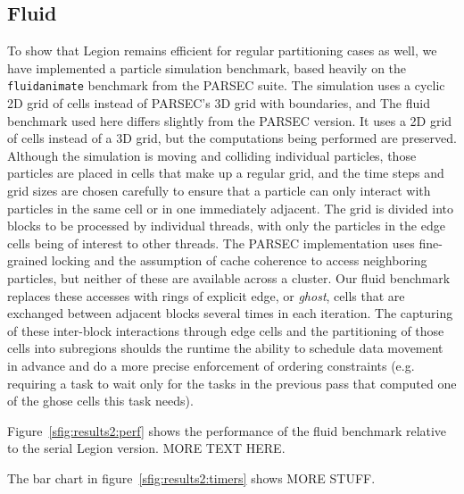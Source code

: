 

\subsection{Fluid}

To show that Legion remains efficient for regular partitioning cases as well,
we have implemented a particle simulation benchmark, based heavily on the
{\tt fluidanimate} benchmark from the PARSEC suite.  The simulation uses a
cyclic 2D grid of cells instead of PARSEC's 3D grid with boundaries, and 
The fluid benchmark used here differs slightly from the PARSEC version.  It
uses a 2D grid of cells instead of a 3D grid, but the computations being 
performed are preserved.
Although the 
simulation is moving and colliding individual particles, those particles
are placed in cells that make up a regular grid, and the time steps and grid
sizes are chosen carefully to ensure that a particle can only interact with
particles in the same cell or in one immediately adjacent.  The grid is
divided into blocks to be processed by individual threads, with only the
particles in the edge cells being of interest to other threads.  The PARSEC
implementation uses fine-grained locking and the assumption of cache
coherence to access neighboring particles, but neither of these are available
across a cluster.  Our fluid benchmark replaces these accesses with rings of
explicit edge, or \emph{ghost}, cells that are exchanged between adjacent
blocks several times in each iteration.  The capturing of these inter-block
interactions through edge cells and the partitioning of those cells into
subregions shoulds the runtime the ability to schedule data movement in
advance and do a more precise enforcement of ordering constraints (e.g.
requiring a task to wait only for the tasks in the previous pass that computed
one of the ghose cells this task needs).

Figure~\ref{sfig:results2:perf} shows the performance of the fluid benchmark
relative to the serial Legion version.  MORE TEXT HERE.

The bar chart in figure~\ref{sfig:results2:timers} shows MORE STUFF.

